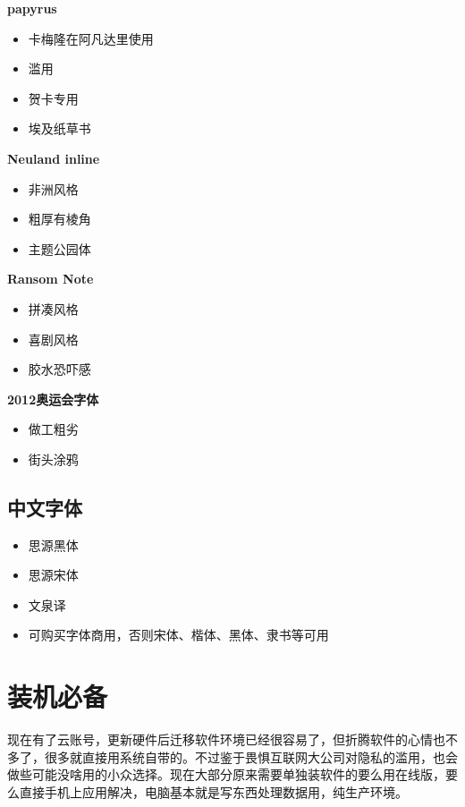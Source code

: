 \documentclass[
  letterpaper,
  DIV=11,
  numbers=noendperiod]{scrreprt}
\providecommand{\tightlist}{%
  \setlength{\itemsep}{0pt}\setlength{\parskip}{0pt}}\usepackage{longtable,booktabs,array}
\begin{document}
\textbf{papyrus}

\begin{itemize}
\tightlist
\item
  卡梅隆在阿凡达里使用
\item
  滥用
\item
  贺卡专用
\item
  埃及纸草书
\end{itemize}

\textbf{Neuland inline}

\begin{itemize}
\tightlist
\item
  非洲风格
\item
  粗厚有棱角
\item
  主题公园体
\end{itemize}

\textbf{Ransom Note}

\begin{itemize}
\tightlist
\item
  拼凑风格
\item
  喜剧风格
\item
  胶水恐吓感
\end{itemize}

\textbf{2012奥运会字体}

\begin{itemize}
\tightlist
\item
  做工粗劣
\item
  街头涂鸦
\end{itemize}

\subsection{中文字体}\label{ux4e2dux6587ux5b57ux4f53}

\begin{itemize}
\tightlist
\item
  思源黑体
\item
  思源宋体
\item
  文泉译
\item
  可购买字体商用，否则宋体、楷体、黑体、隶书等可用
\end{itemize}

\section{装机必备}\label{ux88c5ux673aux5fc5ux5907}

现在有了云账号，更新硬件后迁移软件环境已经很容易了，但折腾软件的心情也不多了，很多就直接用系统自带的。不过鉴于畏惧互联网大公司对隐私的滥用，也会做些可能没啥用的小众选择。现在大部分原来需要单独装软件的要么用在线版，要么直接手机上应用解决，电脑基本就是写东西处理数据用，纯生产环境。
\end{document}
